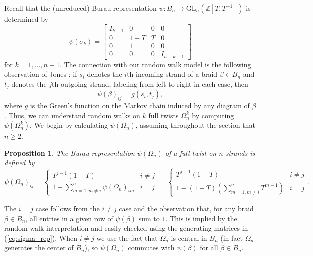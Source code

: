 \documentclass[11pt,hyp,]{nyjm}
\newcommand{\Z}{\mathbb{Z}}
\numberwithin{thm}{section}
\newtheorem{prop}[thm]{Proposition}
\theoremstyle{definition}
\theoremstyle{remark}
\begin{document}
	Recall that the (unreduced) Burau representation $\psi : B_n \to \text{GL}_n(\Z[T,T^{-1}])$ is determined by 
	\begin{equation}
		\label{eq:sigma_rep}
		\psi(\sigma_k) = \begin{bmatrix}
			I_{k - 1} & 0 & 0 & 0 \\
			0 & 1 - T & T & 0 \\
			0 & 1 & 0 & 0 \\
			0 & 0 & 0 & I_{n - k - 1}
		\end{bmatrix} 
	\end{equation}
	for $k = 1, \dots, n - 1$. The connection with our random walk model is the following observation of Jones \cite{jon87}: if $s_i$ denotes the $i$th incoming strand of a braid $\beta \in B_n$ and $t_j$ denotes the $j$th outgoing strand, labeling from left to right in each case, then
	\begin{equation}
		\label{eq:braid_prob}
		\psi(\beta)_{ij} = g(s_i, t_j),
	\end{equation}
	where $g$ is the Green's function on the Markov chain induced by any diagram of $\beta$. Thus, we can understand random walks on $k$ full twists $\Omega_n^k$ by computing $\psi(\Omega_n^k)$. We begin by calculating $\psi(\Omega_n)$, assuming throughout the section that $n \geq 2$.
	
	\begin{prop}
		\label{thm:twist_rep}
		The Burau representation $\psi(\Omega_n)$ of a full twist on $n$ strands is defined by
		$$
			\psi(\Omega_n)_{ij} = \begin{cases}
				T^{j - 1}(1 - T) & i \neq j \\
				1 - \sum_{m = 1, m \neq i}^n \psi(\Omega_n)_{im} & i = j
			\end{cases} = \begin{cases}
			T^{j - 1}(1 - T) & i \neq j \\
			1 - (1 - T)(\sum_{m = 1, m \neq i}^n T^{m - 1})  & i = j
		\end{cases}.
		$$
	\end{prop}

	The $i = j$ case follows from the $i \neq j$ case and the observation that, for any braid $\beta \in B_n$, all entries in a given row of $\psi(\beta)$ sum to $1$. This is implied by the random walk interpretation and easily checked using the generating matrices in (\ref{eq:sigma_rep}). When $i \neq j$ we use the fact that $\Omega_n$ is central in $B_n$ (in fact $\Omega_n$ generates the center of $B_n$), so $\psi(\Omega_n)$ commutes with $\psi(\beta)$ for all $\beta \in B_n$.
	
\end{document}
